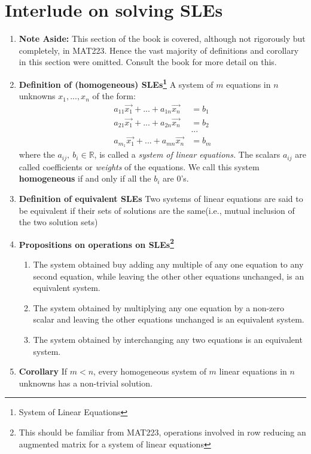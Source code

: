 \documentclass[oneside, 12pt]{book}
\newcommand{\settag}[1]{\renewcommand{\theenumi}{#1}}
\newcommand{\R}{\mathbb{R}}
\newcommand{\tbf}[1]{\textbf{#1}}
\newcommand{\tit}[1]{\textit{#1}}
\begin{document}
\section{Interlude on solving SLEs}
    \begin{enumerate}
        \settag{1.5.*}
        \item \tbf{Note Aside: }This section of the book is covered, although not rigorously but completely, in MAT223. Hence the vast majority of definitions and corollary in this section were omitted. Consult the book for more detail on this.
        
        \settag{1.5.1}
        \item \tbf{Definition of (homogeneous) SLEs\footnote{System of Linear Equations}} A system of $m$ equations in $n$ unknowns $x_1,...,x_n$ of the form:
        \begin{align*}
            a_{11}\vec{x_1}+...+a_{1n}\vec{x_n} &= b_1 \\
            a_{21}\vec{x_1}+...+a_{2n}\vec{x_n} &= b_2 \\
            &\mbox{...} \\
            a_{m_1}\vec{x_1}+...+a_{mn}\vec{x_n} &= b_m
        \end{align*}
        where the $a_{ij},~b_i\in \R$, is called a \tit{system of linear equations.} The scalars $a_{ij}$ are called coefficients or \tit{weights} of the equations. We call this system \textbf{homogeneous} if and only if all the $b_i$ are 0's.
        
        \settag{1.5.2}
        \item \tbf{Definition of equivalent SLEs} Two systems of linear equations are said to be equivalent if their sets of solutions are the same(i.e., mutual inclusion of the two solution sets)
        
        \settag{1.5.3}
        \item \tbf{Propositions on operations on SLEs\footnote{This should be familiar from MAT223, operations involved in row reducing an augmented matrix for a system of linear equations}}
        \begin{enumerate}
            \item The system obtained buy adding any multiple of any one equation to any second equation, while leaving the other other equations unchanged, is an equivalent system.
            \item The system obtained by multiplying any one equation by a non-zero scalar and leaving the other equations unchanged is an equivalent system.
            \item The system obtained by interchanging any two equations is an equivalent system.
        \end{enumerate}
        
        \settag{1.5.13}
        \item \tbf{Corollary} If $m<n$, every homogeneous system of $m$ linear equations in $n$ unknowns has a non-trivial solution.
    \end{enumerate}
    
\end{document}
